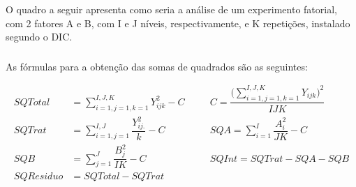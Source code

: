 \documentclass[14pt,aspectratio=1610]{beamer}
\begin{document}
\begin{frame}{}
\frametitle{}
\begin{block}{}
\justifying
O quadro a seguir apresenta como seria a análise de um experimento
fatorial, com 2 fatores A e B, com I e J níveis, respectivamente, e K repetições,
instalado segundo o DIC.
\end{block}
\pause
\begin{block}{}
\begin{table}[!h]
\end{table}
\end{block}
\end{frame}

\begin{frame}{}
\frametitle{}
\begin{block}{}
\justifying
As fórmulas para a obtenção das somas de quadrados são as seguintes:

\begin{align*}
SQTotal&={\displaystyle \sum_{i=1,j=1,k=1}^{I,J,K}Y_{ijk}^{2}-C} &\quad& 
C=\dfrac{\Biggl({\displaystyle \sum_{i=1,j=1,k=1}^{I,J,K}Y_{ijk}\Biggl)^{2}}}{IJK}\\
SQTrat&={\displaystyle \sum_{i=1,j=1}^{I,J}\dfrac{Y_{ij.}^{2}}{k}-C} &\quad& 
SQA={\displaystyle \sum_{i=1}^{I}\dfrac{A_{i}^{2}}{JK}-C}\\
SQB&={\displaystyle \sum_{j=1}^{J}\dfrac{B_{j}^{2}}{IK}-C} &\quad& 
SQInt=SQTrat-SQA-SQB\\
SQResiduo&=SQTotal-SQTrat &\quad& 
 \\
\end{align*}

\end{block}
\end{frame}
\end{document}

